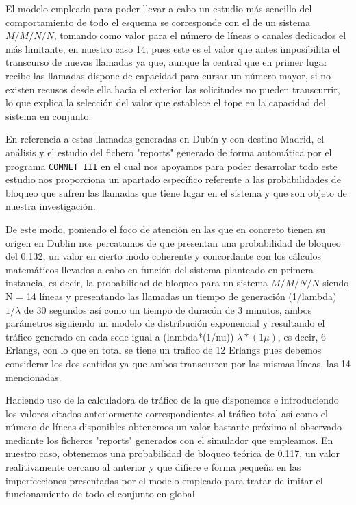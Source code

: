 \documentclass{article}[10pt]
\begin{document}
		El modelo empleado para poder llevar a cabo un estudio más sencillo del comportamiento de todo el esquema se corresponde con el de un sistema $M/M/N/N$, tomando como valor para el número de líneas o canales dedicados el más limitante, en nuestro caso 14, pues este es el valor que antes imposibilita el transcurso de nuevas llamadas ya que, aunque la central que en primer lugar recibe las llamadas dispone de capacidad para cursar un número mayor, si no existen recusos desde ella hacia el exterior las solicitudes no pueden transcurrir, lo que explica la selección del valor que establece el tope en la capacidad del sistema en conjunto.

		En referencia a estas llamadas generadas en Dubín y con destino Madrid, el análisis y el estudio del fichero "reports" generado de forma automática por el programa \texttt{COMNET III} en el cual nos apoyamos para poder desarrolar todo este estudio nos proporciona un apartado específico referente a las probabilidades de bloqueo que sufren las llamadas que tiene lugar en el sistema y que son objeto de nuestra investigación.

		De este modo, poniendo el foco de atención en las que en concreto tienen su origen en Dublin nos percatamos de que presentan una probabilidad de bloqueo del 0.132, un valor en cierto modo coherente y concordante con los cálculos matemáticos llevados a cabo en función del sistema planteado en primera instancia, es decir, la probabilidad de bloqueo para un sistema $M/M/N/N$ siendo N = 14 líneas y presentando las llamadas un tiempo de generación (1/lambda) $1/\lambda$ de 30 segundos así como un tiempo de duracón de 3 minutos, ambos parámetros siguiendo un modelo de distribución exponencial y resultando el tráfico generado en cada sede igual a (lambda*(1/nu)) $\lambda*(1\mu)$, es decir, 6 Erlangs, con lo que en total se tiene un trafico de 12 Erlangs pues debemos considerar los dos sentidos ya que ambos transcurren por las mismas líneas, las 14 mencionadas.

		Haciendo uso de la calculadora de tráfico de la que disponemos e introduciendo los valores citados anteriormente correspondientes al tráfico total así como el número de líneas disponibles obtenemos un valor bastante próximo al observado mediante los ficheros "reports" generados con el simulador que empleamos. En nuestro caso, obtenemos una probabilidad de bloqueo teórica de 0.117, un valor realitivamente cercano al anterior y que difiere e forma pequeña en las imperfecciones presentadas por el modelo empleado para tratar de imitar el funcionamiento de todo el conjunto en global.
\end{document}
